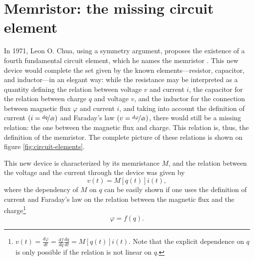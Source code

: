 \section{Memristor: the missing circuit element}

In 1971, Leon O. Chua, using a symmetry argument, proposes the existence of a fourth fundamental circuit element, which he names the memristor \cite{Chua1971}. This new device would complete the set given by the known elements---resistor, capacitor, and inductor---in an elegant way: while the resistance may be interpreted as a quantity defining the relation between voltage $v$ and current $i$, the capacitor for the relation between charge $q$ and voltage $v$, and the inductor for the connection between magnetic flux $\varphi$ and current $i$, and taking into account the definition of current $(i=\nicefrac{dq}{dt})$ and Faraday's law $(v=\nicefrac{d\varphi}{dt})$, there would still be a missing relation: the one between the magnetic flux and charge. This relation is, thus, the definition of the memristor. The complete picture of these relations is shown on figure \ref{fig:circuit-elements}.

This new device is characterized by its memristance $M$, and the relation between the voltage and the current through the device was given by
\begin{equation}
  v(t) = M[q(t)]i(t),
  \label{eq:v_x_i_memristor}
\end{equation}
where the dependency of $M$ on $q$ can be easily shown if one uses the definition of current and Faraday's law on the relation between the magnetic flux and the charge\footnote{$v(t)=\frac{d \varphi}{d t} = \frac{d f}{d q} \frac{d q}{d t} = M[q(t)]i(t)$. Note that the explicit dependence on $q$ is only possible if the relation is not linear on $q$.} 
\begin{equation}
  \varphi=f(q).
  \label{eq:phi_x_q} 
\end{equation}

